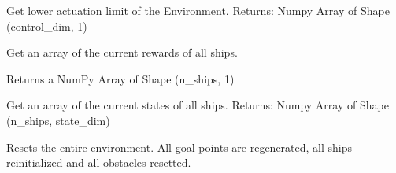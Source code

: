 \documentclass[letterpaper,10pt,english]{sphinxmanual}
\begin{document}
\begin{fulllineitems}
\begin{fulllineitems}
\end{fulllineitems}


\begin{fulllineitems}
\label{\detokenize{pomdp_spaceship_env:pomdp_spaceship_env.Env.GetMinIn}}
Get lower actuation limit of the Environment.
Returns:
Numpy Array of Shape (control\_dim, 1)

\end{fulllineitems}


\begin{fulllineitems}
\label{\detokenize{pomdp_spaceship_env:pomdp_spaceship_env.Env.GetReward}}
Get an array of the current rewards of all ships.

Returns a NumPy Array of Shape (n\_ships, 1)

\end{fulllineitems}


\begin{fulllineitems}
\label{\detokenize{pomdp_spaceship_env:pomdp_spaceship_env.Env.GetState}}
Get an array of the current states of all ships.
Returns:
Numpy Array of Shape (n\_ships, state\_dim)

\end{fulllineitems}


\begin{fulllineitems}
\label{\detokenize{pomdp_spaceship_env:pomdp_spaceship_env.Env.Reset}}
Resets the entire environment. All goal points are regenerated, all ships reinitialized and all obstacles resetted.


\end{fulllineitems}
\end{fulllineitems}
\end{document}
